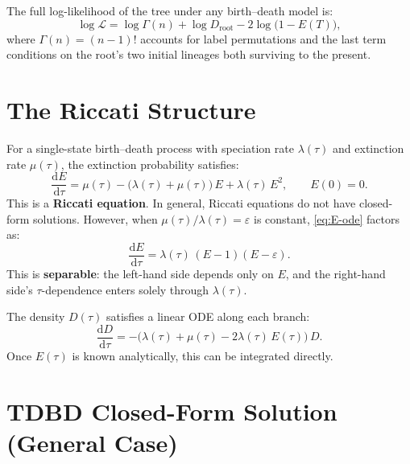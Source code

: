 \documentclass[11pt,a4paper]{article}
\newcommand{\dd}{\mathrm{d}}
\newcommand{\eps}{\varepsilon}
\theoremstyle{plain}
\theoremstyle{definition}
\theoremstyle{remark}
\begin{document}
The full log-likelihood of the tree under any birth--death model is:
\begin{equation}\label{eq:loglik}
  \log \mathcal{L} = \log \Gamma(n) + \log D_{\text{root}} - 2\log\bigl(1 - E(T)\bigr),
\end{equation}
where $\Gamma(n) = (n-1)!$ accounts for label permutations and the last term conditions on the root's two initial lineages both surviving to the present.

\section{The Riccati Structure}

For a single-state birth--death process with speciation rate $\lambda(\tau)$ and extinction rate $\mu(\tau)$, the extinction probability satisfies:
\begin{equation}\label{eq:E-ode}
  \frac{\dd E}{\dd \tau} = \mu(\tau) - \bigl(\lambda(\tau) + \mu(\tau)\bigr)\,E + \lambda(\tau)\,E^2, \qquad E(0) = 0.
\end{equation}
This is a \textbf{Riccati equation}.
In general, Riccati equations do not have closed-form solutions.
However, when $\mu(\tau)/\lambda(\tau) = \eps$ is constant, \eqref{eq:E-ode} factors as:
\begin{equation}\label{eq:E-ode-factored}
  \frac{\dd E}{\dd \tau} = \lambda(\tau)\,(E - 1)(E - \eps).
\end{equation}
This is \textbf{separable}: the left-hand side depends only on $E$, and the right-hand side's $\tau$-dependence enters solely through $\lambda(\tau)$.

The density $D(\tau)$ satisfies a linear ODE along each branch:
\begin{equation}\label{eq:D-ode}
  \frac{\dd D}{\dd \tau} = -\bigl(\lambda(\tau) + \mu(\tau) - 2\lambda(\tau)\,E(\tau)\bigr)\,D.
\end{equation}
Once $E(\tau)$ is known analytically, this can be integrated directly.

\section{TDBD Closed-Form Solution (General Case)}
\label{sec:tdbd}
\end{document}
